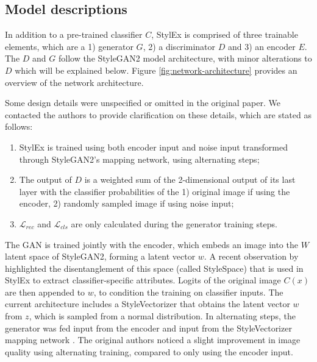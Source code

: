 \subsection{Model descriptions}

In addition to a pre-trained classifier $C$, StylEx is comprised of three trainable elements, which are a 1) generator $G$,  2) a discriminator $D$ and 3) an encoder $E$. The $D$ and $G$ follow the StyleGAN2 model architecture, with minor alterations to $D$ which will be explained below. Figure \ref{fig:network-architecture} provides an overview of the network architecture.

Some design details were unspecified or omitted in the original paper. We contacted the authors to provide clarification on these details, which are stated as follows:
\begin{enumerate}
    \item StylEx is trained using both encoder input and noise input transformed through StyleGAN2's mapping network, using alternating steps; \label{alternate training}
    \item The output of $D$ is a weighted sum of the 2-dimensional output of its last layer with the classifier probabilities of the 1) original image if using the encoder, 2) randomly sampled image if using noise input; \label{point:discriminator_point}
    \item $\mathcal{L}_{rec}$ and $\mathcal{L}_{cls}$ are only calculated during the generator training steps.
\end{enumerate}

The GAN is trained jointly with the encoder, which embeds an image into the $W$ latent space of StyleGAN2, forming a latent vector $w$. A recent observation by \cite{wu2020stylespace} highlighted the disentanglement of this space (called StyleSpace) that is used in StylEx to extract classifier-specific attributes. Logits of the original image $C(x)$ are then appended to $w$, to condition the training on classifier inputs. The current architecture includes a StyleVectorizer that obtains the latent vector $w$ from $z$, which is sampled from a normal distribution. In alternating steps, the generator was fed input from the encoder and input from the StyleVectorizer mapping network \cite{karras2019style}. The original authors noticed a slight improvement in image quality using alternating training, compared to only using the encoder input.

